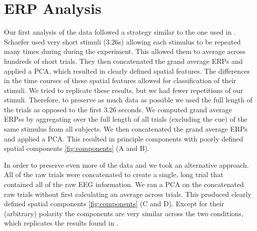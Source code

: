 \chapter*{ERP Analysis}
Our first analysis of the data followed a strategy similar to the one used in \cite{schaefer_name_2011}.
Schaefer \etal \cite{schaefer_name_2011} used very short stimuli (3.26s) allowing each stimulus to be repeated many times during during the experiment. 
This allowed them to average across hundreds of short trials. 
They then concatenated the grand average ERPs and applied a \ac{PCA}, which resulted in clearly defined spatial features. 
The differences in the time courses of these spatial features allowed for classification of their stimuli. 
We tried to replicate these results, but we had fewer repetitions of our stimuli. 
Therefore, to preserve as much data as possible we used the full length of the trials as opposed to the first 3.26 seconds. 
We computed grand average \acp{ERP}s by aggregating over the full length of all trials (excluding the cue) of the same stimulus from all subjects. 
We then concatenated the grand average \acp{ERP} and applied a \ac{PCA}. 
This resulted in principle components with poorly defined spatial components \autoref{fig:components} (A and B).

In order to preserve even more of the data and we took an alternative approach. 
All of the raw trials were concatenated to create a single, long trial that contained all of the raw EEG information.
We ran a \ac{PCA} on the concatenated raw trials without first calculating an average across trials. 
This produced clearly defined spatial components \autoref{fig:components} (C and D). 
Except for their (arbitrary) polarity the components are very similar across the two conditions, which replicates the results found in \cite{schaefer_name_2011}.

